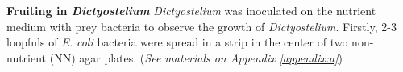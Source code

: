 \textbf{Fruiting in \textsl{Dictyostelium}} \textsl{Dictyostelium} was inoculated on the nutrient medium with prey bacteria to observe the growth of \textsl{Dictyostelium}. Firstly, 2-3 loopfuls of \textsl{E. coli} bacteria were spread in a strip in the center of two non-nutrient (NN) agar plates. (\textit{See materials on Appendix \ref{appendix:a}})